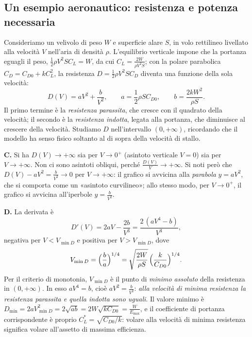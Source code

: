 \subsection{Un esempio aeronautico: resistenza e potenza necessaria}

Consideriamo un velivolo di peso $W$ e superficie alare $S$, in volo rettilineo
livellato alla velocità $V$ nell'aria di densità $\rho$. L'equilibrio verticale impone
che la portanza eguagli il peso, $\frac12\rho V^{2}SC_{L}=W$, da cui
$C_{L}=\frac{2W}{\rho V^{2}S}$; con la polare parabolica $C_{D}=C_{D0}+kC_{L}^{2}$, la
resistenza $D=\frac12\rho V^{2}SC_{D}$ diventa una funzione della sola velocità:
\begin{equation}\label{eq:resistenza-V}
  D(V)=aV^{2}+\frac{b}{V^{2}}, \qquad a=\frac12\rho SC_{D0}, \qquad b=\frac{2kW^{2}}{\rho S} .
\end{equation}
Il primo termine è la \emph{resistenza parassita}, che cresce con il quadrato della
velocità; il secondo è la \emph{resistenza indotta}, legata alla portanza, che
diminuisce al crescere della velocità. Studiamo $D$ nell'intervallo $(0,+\infty)$,
ricordando che il modello ha senso fisico soltanto al di sopra della velocità di stallo.

\textbf{C.} Si ha $D(V)\to+\infty$ sia per $V\to0^{+}$ (asintoto verticale $V=0$) sia
per $V\to+\infty$. Non ci sono asintoti obliqui, perché $\frac{D(V)}V\to+\infty$. Si noti
però che $D(V)-aV^{2}=\frac b{V^{2}}\to0$ per $V\to+\infty$: il grafico si avvicina
alla \emph{parabola} $y=aV^{2}$, che si comporta come un «asintoto curvilineo»; allo
stesso modo, per $V\to0^{+}$, il grafico si avvicina all'iperbole $y=\frac b{V^{2}}$.

\textbf{D.} La derivata è
\[
  D'(V)=2aV-\frac{2b}{V^{3}}=\frac{2\,(aV^{4}-b)}{V^{3}},
\]
negativa per $V<V_{\min D}$ e positiva per $V>V_{\min D}$, dove
\begin{equation}\label{eq:V-min-D}
  V_{\min D}=\Bigl(\frac ba\Bigr)^{1/4}=\sqrt{\frac{2W}{\rho S}}\,\Bigl(\frac{k}{C_{D0}}\Bigr)^{1/4} .
\end{equation}
Per il criterio di monotonia, $V_{\min D}$ è il punto di \emph{minimo assoluto} della
resistenza in $(0,+\infty)$. In esso $aV^{4}=b$, cioè $aV^{2}=\frac b{V^{2}}$: \emph{alla
velocità di minima resistenza la resistenza parassita e quella indotta sono uguali}. Il
valore minimo è $D_{\min}=2aV_{\min D}^{2}=2\sqrt{ab}=2W\sqrt{kC_{D0}}=\frac{W}{E_{\max}}$,
e il coefficiente di portanza corrispondente è proprio $C_{L}^{*}=\sqrt{C_{D0}/k}$:
volare alla velocità di minima resistenza significa volare all'assetto di massima
efficienza.

